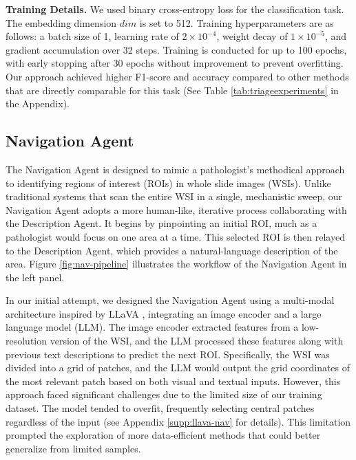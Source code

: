 \noindent
\textbf{Training Details.} We used binary cross-entropy loss for the classification task. The embedding dimension $dim$ is set to 512. Training hyperparameters are as follows: a batch size of 1, learning rate of $2 \times 10^{-4}$, weight decay of $1 \times 10^{-5}$, and gradient accumulation over 32 steps. Training is conducted for up to 100 epochs, with early stopping after 30 epochs without improvement to prevent overfitting. Our approach achieved higher F1-score and accuracy compared to other methods that are directly comparable for this task (See Table \ref{tab:triageexperiments} in the Appendix).


\subsection{Navigation Agent}
\label{nav-agent}
The Navigation Agent is designed to mimic a pathologist’s methodical approach to identifying regions of interest (ROIs) in whole slide images (WSIs). Unlike traditional systems that scan the entire WSI in a single, mechanistic sweep, our Navigation Agent adopts a more human-like, iterative process collaborating with the Description Agent. It begins by pinpointing an initial ROI, much as a pathologist would focus on one area at a time. This selected ROI is then relayed to the Description Agent, which provides a natural-language description of the area. Figure \ref{fig:nav-pipeline} illustrates the workflow of the Navigation Agent in the left panel.

In our initial attempt, we designed the Navigation Agent using a multi-modal architecture inspired by LLaVA \cite{liu2023improved}, integrating an image encoder and a large language model (LLM). The image encoder extracted features from a low-resolution version of the WSI, and the LLM processed these features along with previous text descriptions to predict the next ROI. Specifically, the WSI was divided into a grid of patches, and the LLM would output the grid coordinates of the most relevant patch based on both visual and textual inputs. However, this approach faced significant challenges due to the limited size of our training dataset. The model tended to overfit, frequently selecting central patches regardless of the input (see Appendix \ref{supp:llava-nav} for details). This limitation prompted the exploration of more data-efficient methods that could better generalize from limited samples.

